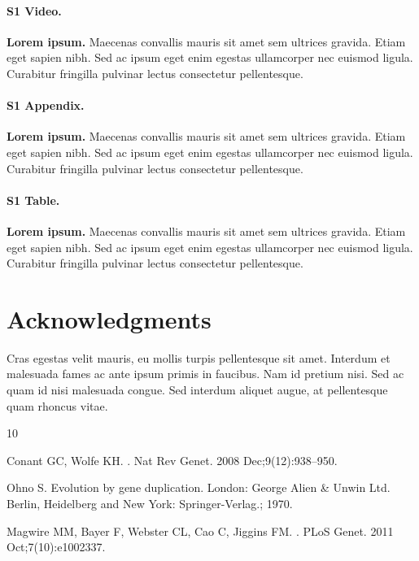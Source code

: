 \documentclass[10pt,letterpaper]{article}
\begin{document}
\paragraph*{S1 Video.}
\label{S1_Video}
{\bf Lorem ipsum.}  Maecenas convallis mauris sit amet sem ultrices gravida. Etiam eget sapien nibh. Sed ac ipsum eget enim egestas ullamcorper nec euismod ligula. Curabitur fringilla pulvinar lectus consectetur pellentesque.

\paragraph*{S1 Appendix.}
\label{S1_Appendix}
{\bf Lorem ipsum.} Maecenas convallis mauris sit amet sem ultrices gravida. Etiam eget sapien nibh. Sed ac ipsum eget enim egestas ullamcorper nec euismod ligula. Curabitur fringilla pulvinar lectus consectetur pellentesque.

\paragraph*{S1 Table.}
\label{S1_Table}
{\bf Lorem ipsum.} Maecenas convallis mauris sit amet sem ultrices gravida. Etiam eget sapien nibh. Sed ac ipsum eget enim egestas ullamcorper nec euismod ligula. Curabitur fringilla pulvinar lectus consectetur pellentesque.

\section*{Acknowledgments}
Cras egestas velit mauris, eu mollis turpis pellentesque sit amet. Interdum et malesuada fames ac ante ipsum primis in faucibus. Nam id pretium nisi. Sed ac quam id nisi malesuada congue. Sed interdum aliquet augue, at pellentesque quam rhoncus vitae.

\nolinenumbers

%
%
%
\begin{thebibliography}{10}

Conant GC, Wolfe KH.
.
\newblock Nat Rev Genet. 2008 Dec;9(12):938--950.

Ohno S.
\newblock Evolution by gene duplication.
\newblock London: George Alien \& Unwin Ltd. Berlin, Heidelberg and New York:
  Springer-Verlag.; 1970.

Magwire MM, Bayer F, Webster CL, Cao C, Jiggins FM.
.
\newblock PLoS Genet. 2011 Oct;7(10):e1002337.

\end{thebibliography}
\end{document}
